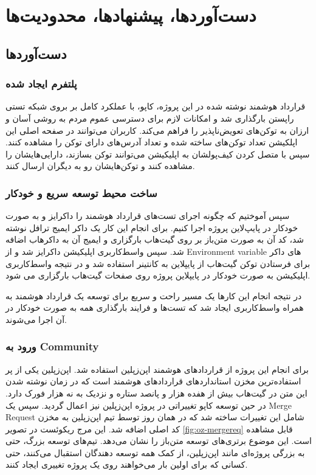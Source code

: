 \chapter{دست‌آوردها، پیشنهاد‌ها، محدودیت‌ها}

\section{دست‌آوردها}

\subsection{پلتفرم ایجاد شده}
قرارداد هوشمند نوشته شده در این پروژه،
کاپو، با عملکرد کامل بر بروی شبکه تستی راپستن بارگذاری شد
و امکانات لازم برای دسترسی عموم مردم به روشی آسان و ارزان به توکن‌های تعویض‌ناپذیر را فراهم می‌کند.
کاربران می‌توانند در صفحه اصلی این اپلکیشن تعداد توکن‌های ساخته شده و تعداد آدرس‌های دارای توکن را مشاهده کنند.
سپس با متصل کردن کیف‌پولشان به اپلیکیشن می‌توانند توکن بسازند،
دارایی‌هایشان را مشاهده کنند و توکن‌هایشان رو به دیگران ارسال کنند.

\subsection{ساخت محیط توسعه سریع و خودکار}
سپس آموختیم که چگونه اجرای تست‌های قرارداد هوشمند را داکرایز و به صورت خودکار در پایپ‌لاین پروژه اجرا کنیم.
برای انجام این کار یک داکر ایمیج ترافل نوشته شد،
کد آن به صورت متن‌باز بر روی گیت‌هاب بارگزاری و ایمیج آن به داکرهاب اضافه شد. سپس واسط‌کاربری اپلیکیشن داکرایز شد و از
\gls{Environment variable}
های داکر برای فرستادن توکن گیت‌هاب از پایپلاین به کانتینر استفاده شد
و در نتیجه واسط‌کاربری اپلیکیشن به صورت خودکار در پایپلاین پروژه روی صفحات گیت‌هاب بارگزاری می شود.

در نتیجه انجام این کارها یک مسیر راحت و سریع برای توسعه یک قرارداد هوشمند به همراه واسط‌کاربری ایجاد شد که تست‌ها
و فرایند بارگذاری همه به صورت خودکار در آن اجرا می‌شوند.


\subsection{ورود به
\gls{Community}}
برای انجام این پروژه از قرارداد‌های هوشمند اپن‌زپلین استفاده شد.
اپن‌زپلین یکی از پر استفاده‌ترین مخزن استانداردهای قراردادهای هوشمند است
که در زمان نوشته شدن این متن در گیت‌هاب بیش از هفده هزار و پانصد ستاره و نزدیک به نه هزار فورک دارد.
در حین توسعه کاپو تغییراتی در پروژه اپن‌زپلین نیز اعمال گردید.
سپس یک
\gls{Merge Request}
شامل این تغییرات ساخته شد که در همان روز توسط تیم اپن‌زپلین به مخزن کد اصلی اضافه شد.
این مرج ریکوئست در تصویر
\ref{fig:oz-mergereq}
قابل مشاهده است.
این موضوع برتری‌های توسعه متن‌باز را نشان می‌دهد.
تیم‌های توسعه بزرگ، حتی به بزرگی پروژه‌ای مانند اپن‌زپلین، از کمک همه توسعه دهندگان استقبال می‌کنند،
حتی کسانی که برای اولین بار می‌خواهند روی یک پروژه تغییری ایجاد کنند.


